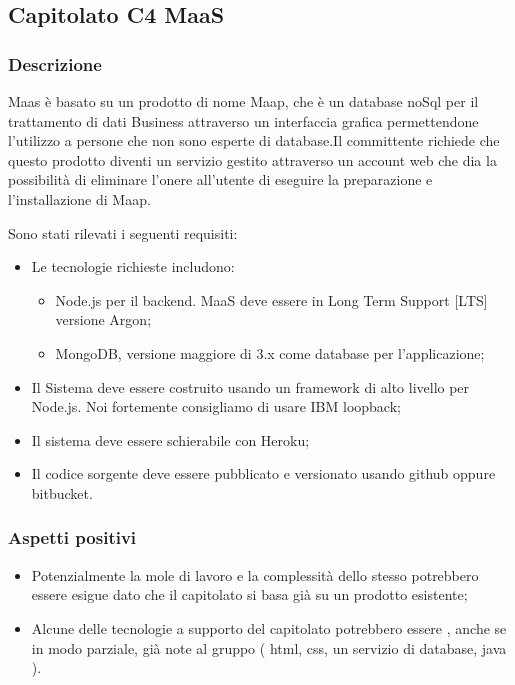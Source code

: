 \documentclass[12pt,a4paper]{article}
\begin{document}
\newpage
\subsection{Capitolato C4 MaaS}
\subsubsection{Descrizione}
Maas è basato su un prodotto di nome Maap, che è un database noSql per il trattamento di dati Business attraverso un interfaccia grafica permettendone l'utilizzo a persone che non sono esperte di database.Il committente richiede che questo prodotto diventi un servizio gestito attraverso un account web che dia la possibilità di eliminare l'onere all'utente di eseguire la preparazione e l'installazione di Maap.

Sono stati rilevati i seguenti requisiti:

\begin{itemize}

\item	Le tecnologie richieste includono:

\begin{itemize}
\item Node.js per il backend. MaaS deve essere in Long Term Support [LTS] versione Argon;
\item	MongoDB, versione maggiore di 3.x come database per l'applicazione; 
\end{itemize}

\item Il Sistema deve essere costruito usando un framework di alto livello per Node.js. Noi fortemente consigliamo di usare IBM loopback;

\item Il sistema deve essere schierabile con Heroku;
 
\item	Il codice sorgente deve essere pubblicato e versionato   usando github oppure bitbucket. 

\end{itemize}

\subsubsection{Aspetti positivi}
\begin{itemize}
\item	Potenzialmente la mole di lavoro e la complessità dello stesso potrebbero essere esigue dato che il capitolato si basa già su un prodotto esistente;

\item	Alcune delle tecnologie a supporto del capitolato potrebbero essere , anche se in modo parziale, già note al gruppo ( html, css, un servizio di	database, java ).
\end{itemize}
\end{document}
